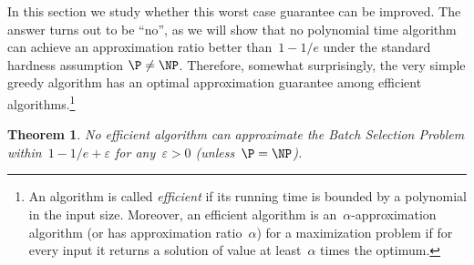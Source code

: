 \documentclass[11pt]{article}
\newtheorem{theorem}{Theorem}
\begin{document}
In this section we study whether this worst case guarantee can be improved. The answer turns out to be ``no'', as we will show that no polynomial time algorithm can achieve an approximation ratio better than~$1 - 1/e$ under the standard hardness assumption $\P \neq \NP$.
%
Therefore, somewhat surprisingly, the very simple greedy algorithm has an optimal approximation guarantee among efficient algorithms.\footnote{An algorithm is called \emph{efficient} if its running time is bounded by a polynomial in the input size. Moreover, an efficient algorithm is an~$\alpha$-approximation algorithm (or has approximation ratio~$\alpha$) for a maximization problem if for every input it returns a solution of value at least~$\alpha$ times the optimum.}
%
\begin{theorem}
\label{theorem_hardness_batch_selection}
No efficient algorithm can approximate the Batch Selection Problem within~$1 - 1/e + \varepsilon$ for any~$\varepsilon > 0$ (unless~$\P = \NP$).
\end{theorem}
\end{document}
